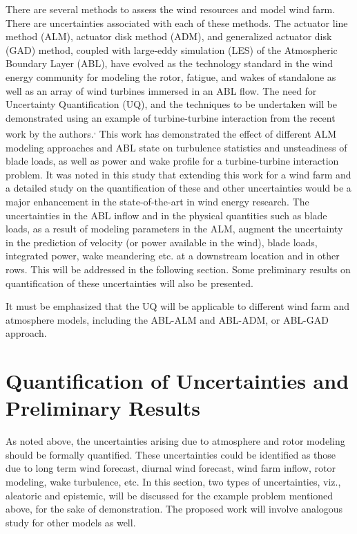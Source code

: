 \documentclass[]{aiaa-tc}%
\begin{document}
There are several methods to assess the wind resources and model wind farm. There are uncertainties associated with each of these methods. The actuator line method (ALM), actuator disk method (ADM), and generalized actuator disk (GAD) method, coupled with large-eddy simulation (LES) of the Atmospheric Boundary Layer (ABL), have evolved as the technology standard in the wind energy community for modeling the rotor, fatigue, and wakes of standalone as well as an array of wind turbines immersed in an ABL flow. The need for Uncertainty Quantification (UQ), and the techniques to be undertaken will be demonstrated using an example of turbine-turbine interaction from the recent work by the authors.\cite{jha:aiaa2014}\textsuperscript{, }\cite{jha:jsee2014} This work has demonstrated the effect of different ALM modeling approaches and ABL state on turbulence statistics and unsteadiness of blade loads, as well as power and wake profile for a turbine-turbine interaction problem. It was noted in this study that extending this work for a wind farm and a detailed study on the quantification of these and other uncertainties would be a major enhancement in the state-of-the-art in wind energy research. The uncertainties in the ABL inflow and in the physical quantities such as blade loads, as a result of modeling parameters in the ALM, augment the uncertainty in the prediction of velocity (or power available in the wind), blade loads, integrated power, wake meandering etc. at a downstream location and in other rows. This will be addressed in the following section. Some preliminary results on quantification of these uncertainties will also be presented.

It must be emphasized that the UQ will be applicable to different wind farm and atmosphere models, including the ABL-ALM and ABL-ADM, or ABL-GAD approach.

\section{Quantification of Uncertainties and Preliminary Results}

As noted above, the uncertainties arising due to atmosphere and rotor modeling should be formally quantified. These uncertainties could be identified as those due to long term wind forecast, diurnal wind forecast, wind farm inflow, rotor modeling, wake turbulence, etc. In this section, two types of uncertainties, viz., aleatoric and epistemic, will be discussed for the example problem mentioned above, for the sake of demonstration. The proposed work will involve analogous study for other models as well. 
\end{document}
